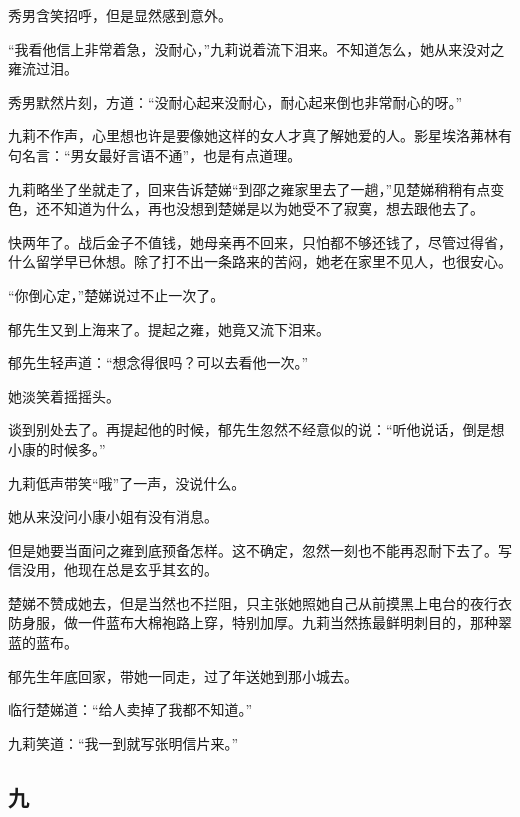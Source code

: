 \par 秀男含笑招呼，但是显然感到意外。
\par “我看他信上非常着急，没耐心，”九莉说着流下泪来。不知道怎么，她从来没对之雍流过泪。
\par 秀男默然片刻，方道：“没耐心起来没耐心，耐心起来倒也非常耐心的呀。”
\par 九莉不作声，心里想也许是要像她这样的女人才真了解她爱的人。影星埃洛茀林有句名言：“男女最好言语不通”，也是有点道理。
\par 九莉略坐了坐就走了，回来告诉楚娣“到邵之雍家里去了一趟，”见楚娣稍稍有点变色，还不知道为什么，再也没想到楚娣是以为她受不了寂寞，想去跟他去了。
\par 快两年了。战后金子不值钱，她母亲再不回来，只怕都不够还钱了，尽管过得省，什么留学早已休想。除了打不出一条路来的苦闷，她老在家里不见人，也很安心。
\par “你倒心定，”楚娣说过不止一次了。
\par 郁先生又到上海来了。提起之雍，她竟又流下泪来。
\par 郁先生轻声道：“想念得很吗？可以去看他一次。”
\par 她淡笑着摇摇头。
\par 谈到别处去了。再提起他的时候，郁先生忽然不经意似的说：“听他说话，倒是想小康的时候多。”
\par 九莉低声带笑“哦”了一声，没说什么。
\par 她从来没问小康小姐有没有消息。
\par 但是她要当面问之雍到底预备怎样。这不确定，忽然一刻也不能再忍耐下去了。写信没用，他现在总是玄乎其玄的。
\par 楚娣不赞成她去，但是当然也不拦阻，只主张她照她自己从前摸黑上电台的夜行衣防身服，做一件蓝布大棉袍路上穿，特别加厚。九莉当然拣最鲜明刺目的，那种翠蓝的蓝布。
\par 郁先生年底回家，带她一同走，过了年送她到那小城去。
\par 临行楚娣道：“给人卖掉了我都不知道。”
\par 九莉笑道：“我一到就写张明信片来。”



\subsection{九}

